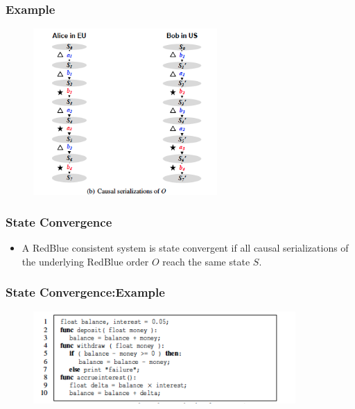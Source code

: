 \documentclass{beamer}
\begin{document}

\begin{frame}
\frametitle{Example}
\begin{figure}[t]
\includegraphics[width=7cm]{pic3.jpg}
\centering
\end{figure}
\end{frame}


\begin{frame}
\frametitle{State Convergence }
\begin{itemize}
\item A RedBlue consistent system is state convergent if all causal serializations of the underlying RedBlue order $O$ reach the same state $S$.
\end{itemize}

\end{frame}


\begin{frame}
\frametitle{State Convergence:Example }
\begin{figure}[t]
\includegraphics[width=10cm]{pic4.jpg}
\centering
\end{figure}

\end{frame}

\end{document}
